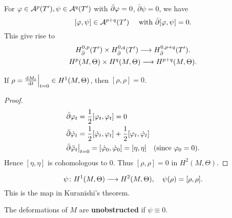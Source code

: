 \documentclass[12pt]{article}
\begin{document}
For \(\varphi\in \mathcal{A}^p(T'),\psi\in \mathcal{A}^q(T')\) with
\(\bar{\partial}\varphi=0\), \(\bar{\partial}\psi=0\), we have \[
  [\varphi,\psi]\in \mathcal{A}^{p+q}(T')\quad\text{ with }\bar{\partial}[\varphi,\psi]=0
.\] This give rise to
\begin{gather*}
  H^{0,p}_{\bar{\partial}}(T')\times H^{0,q}_{\bar{\partial}}(T')
  \longrightarrow H^{0,p+q}_{\bar{\partial}}(T'). \\
  H^{p}(M,\Theta)\times H^q(M,\Theta)\longrightarrow H^{p+q}(M,\Theta).
\end{gather*}
\begin{theorem}
  If \(\rho=\dv{M_t}{t}\Big|_{t=0}\in H^1(M,\Theta)\), then \([\rho,\rho]=0\).
\end{theorem}
\begin{proof}
  \begin{align*}
    &\bar{\partial}\varphi_t=\frac{1}{2}[\varphi_t,\varphi_t]=0 \\
    &\bar{\partial}\dot{\varphi}_t=\frac{1}{2}[\dot{\varphi}_t,\varphi_t]+\frac{1}{2}
    [\varphi_t,\dot{\varphi}_t] \\
    &\bar{\partial}\ddot{\varphi}_t\big|_{t=0}=[\dot{\varphi}_0,\dot{\varphi}_0]
    =[\eta,\eta]\quad(\text{since }\varphi_0=0)
  .\end{align*}
  Hence \([\eta,\eta]\) is cohomologous to 0. Thus \([\rho,\rho]=0\) in
  \(H^2(M,\Theta)\).
\end{proof}

\begin{definition}
  \[
    \psi\colon H^1(M,\Theta)\longrightarrow H^2(M,\Theta),\quad \psi(\rho)=[\rho,\rho]
  .\] This is the map in Kuranishi's theorem.
\end{definition}
\begin{definition}
  The deformations of \(M\) are \textbf{unobstructed} if \(\psi\equiv 0\).
\end{definition}
\end{document}
